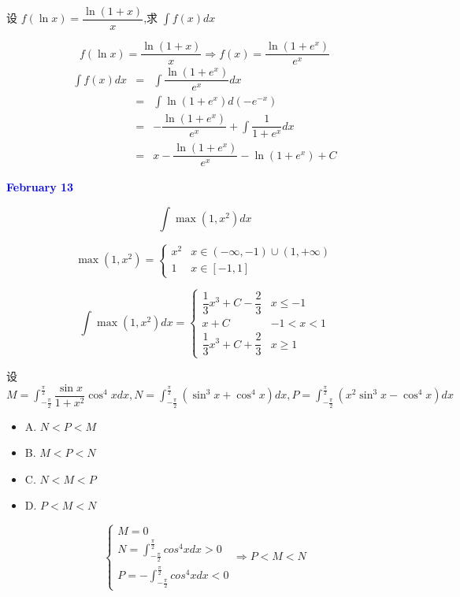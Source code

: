 \begin{example}[][Exam: 28.2.10]
	设 $f(\ln x)=\dfrac{\ln(1+x)}{x}$,求 $\int f(x)dx$
\end{example}
\begin{solution}

	$$f(\ln x) = \dfrac{\ln(1+x)}{x}\Rightarrow f(x) = \dfrac{\ln(1+e^{x})}{e^{x}}$$
	\begin{eqnarray*}
		\int f(x)dx & = & \int \dfrac{\ln(1+e^{x})}{e^{x}}dx\\
		  			& = & \int \ln(1+e^{x})d(-e^{-x})\\
		  			& = & -\dfrac{\ln(1+e^{x})}{e^{x}} + \int \dfrac{1}{1+e^{x}}dx\\
					& = & x - \dfrac{\ln(1+e^{x})}{e^{x}} - \ln(1+e^{x}) + C 
	\end{eqnarray*}
\end{solution}

\textcolor{blue}{\textbf{February 13}}

\begin{example}[][Exam: 28.2.11]
	$$\int \max(1,x^{2})dx$$
\end{example}
\begin{solution}
	
	$$\max(1,x^{2}) = 
	\begin{cases}
		x^{2} & x\in(-\infty,-1)\cup(1,+\infty)\\
		1 & x\in[-1,1]
	\end{cases}$$

	$$\int \max(1,x^{2}) dx = 
	\begin{cases}
		\dfrac{1}{3}x^{3} + C -\dfrac{2}{3} & x\leq -1\\
		x + C & -1 < x < 1\\
		\dfrac{1}{3}x^{3} + C +\dfrac{2}{3} & x\geq 1
	\end{cases}$$
\end{solution}

\begin{example}[][Exam: 28.2.12]
	设 $M=\int_{-\frac{\pi}{2}}^{\frac{\pi}{2}}\dfrac{\sin x}{1+x^{2}}\cos^{4}xdx,N=\int_{-\frac{\pi}{2}}^{\frac{\pi}{2}}(\sin^{3}x+\cos^{4}x)dx,P=\int_{-\frac{\pi}{2}}^{\frac{\pi}{2}}(x^{2}\sin^{3}x-\cos^{4}x)dx$
\begin{itemize}
	\item A. $N<P<M$
	\item B. $M<P<N$
	\item C. $N<M<P$
	\item D. $P<M<N$
\end{itemize}
\end{example}
\begin{solution}
	$$\begin{cases}
	  M = 0\\
	  N = \int_{-\frac{\pi}{2}}^{\frac{\pi}{2}}cos^{4}xdx > 0\\
	  P = -\int_{-\frac{\pi}{2}}^{\frac{\pi}{2}}cos^{4}xdx < 0
	\end{cases}\Rightarrow P < M < N$$
\end{solution}


